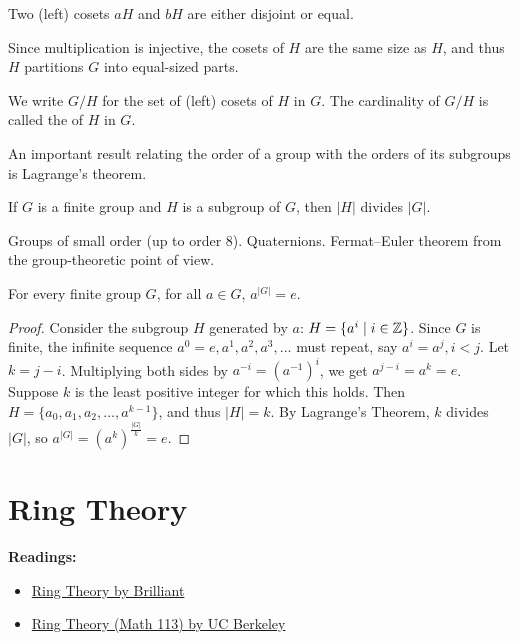 Two (left) cosets $aH$ and $bH$ are either disjoint or equal. 

Since multiplication is injective, the cosets of $H$ are the same size as $H$, and thus $H$ partitions $G$ into equal-sized parts.

\begin{notation}
We write $G/H$ for the set of (left) cosets of $H$ in $G$. The cardinality of $G/H$ is called the  of $H$ in $G$.
\end{notation}

An important result relating the order of a group with the orders of its subgroups is Lagrange's theorem.

\begin{theorem}
If $G$ is a finite group and $H$ is a subgroup of $G$, then $|H|$ divides $|G|$.
\end{theorem}

Groups of small order (up to order 8). Quaternions. Fermat--Euler theorem
from the group-theoretic point of view.

\begin{theorem}
For every finite group $G$, for all $a \in G$, $a^{|G|}=e$.
\end{theorem}

\begin{proof}
Consider the subgroup $H$ generated by $a$: $H = \{a^i \mid i \in \mathbb Z\}$. Since $G$ is finite, the infinite sequence $a^0=e, a^1, a^2, a^3, \dots$ must repeat, say $a^i = a^j, i < j$. Let $k=j-i$. Multiplying both sides by $a^{-i} = (a^{-1})^i$, we get $a^{j-i} = a^k = e$. Suppose $k$ is the least positive integer for which this holds. Then $H = \{a_0, a_1, a_2, \dots, a^{k-1}\}$, and thus $|H| = k$. By Lagrange’s Theorem, $k$ divides $|G|$, so $a^{|G|} = (a^k)^\frac{|G|}{k} = e$.
\end{proof}

\chapter{Ring Theory}
\textbf{Readings:}
\begin{itemize}
\item \href{https://brilliant.org/wiki/ring-theory/}{Ring Theory by Brilliant}
\item \href{https://math.berkeley.edu/~gmelvin/math113su14/math113su14notes2.pdf}{Ring Theory (Math 113) by UC Berkeley}
\end{itemize}

